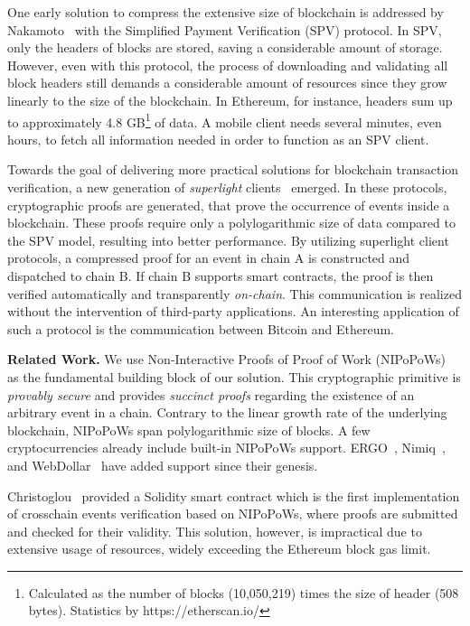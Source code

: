 One early solution to compress the extensive size of blockchain is addressed by
Nakamoto~\cite{nakamoto} with the Simplified Payment Verification (SPV)
protocol. In SPV, only the headers of blocks are stored, saving a considerable
amount of storage.  However, even with this protocol, the process of
downloading and validating all block headers still demands a considerable
amount of resources since they grow linearly to the size of the blockchain.
In Ethereum, for instance, headers sum up to approximately 4.8
GB\footnote{Calculated as the number of blocks (10,050,219) times the size of
header (508 bytes). Statistics by https://etherscan.io/} of data. A mobile
client needs several minutes, even hours, to fetch all information needed in
order to function as an SPV client.

Towards the goal of delivering more practical solutions for blockchain
transaction verification, a new generation of \emph{superlight}
clients~\cite{popow, nipopows, compactsuperblocks, flyclient} emerged. In these
protocols, cryptographic proofs are generated, that prove the occurrence of
events inside a blockchain. These proofs require only a polylogarithmic size of
data compared to the SPV model, resulting into better performance. By utilizing
superlight client protocols, a compressed proof for an event in chain A is
constructed and dispatched to chain B. If chain B supports smart contracts, the
proof is then verified automatically and transparently \emph{on-chain}. This
communication is realized without the intervention of third-party applications.
An interesting application of such a protocol is the communication between
Bitcoin and Ethereum.

\noindent

\textbf{Related Work.} We use Non-Interactive Proofs of Proof of Work
(NIPoPoWs)~\cite{nipopows, pow-sidechains} as the fundamental building block of
our solution. This cryptographic primitive is \emph{provably secure} and
provides \emph{succinct proofs} regarding the existence of an arbitrary event
in a chain. Contrary to the linear growth rate of the underlying blockchain,
NIPoPoWs span polylogarithmic size of blocks. A few cryptocurrencies already
include built-in NIPoPoWs support. ERGO~\cite{ergo}, Nimiq~\cite{nimiq}, and
WebDollar~\cite{webdollar} have added support since their genesis.

Christoglou~\cite{gglou} provided a Solidity smart contract which is the first
implementation of crosschain events verification based on NIPoPoWs, where
proofs are submitted and checked for their validity. This solution, however, is
impractical due to extensive usage of resources, widely exceeding the Ethereum
block gas limit.

